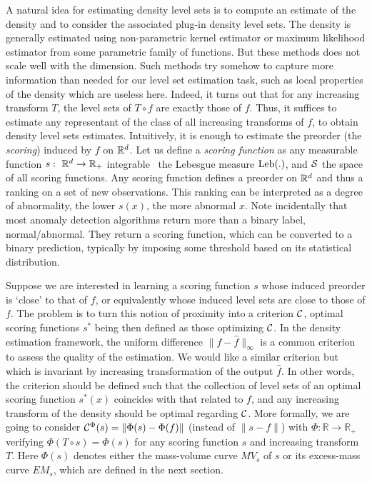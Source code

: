 
A natural idea for estimating density level sets is to compute an estimate of the density and to consider the associated plug-in density level sets.
The density is generally estimated using non-parametric kernel estimator or maximum likelihood estimator from some parametric family of functions. But these methods does not scale well with the dimension. Such methods try somehow to capture more information than needed for our level set estimation task, such as local properties of the density which are useless here. Indeed, it turns out that for any increasing transform $T$, the level sets of $T\circ f$ are exactly those of $f$. Thus, it suffices to estimate any representant of the class of all increasing transforms of $f$, to obtain density level sets estimates. Intuitively, it is enough to estimate the preorder (the \emph{scoring}) induced by $f$ on $\rset^d$. Let us define a \emph{scoring function} as any measurable function $s:~\rset^d \to \rset_+$ integrable \wrt~the Lebesgue measure $\leb(.)$, and $\S$ the space of all scoring functions.
Any scoring function defines a preorder on $\rset^d$ and thus a ranking on a set of new observations. This ranking can be interpreted as a degree of abnormality, the lower $s(x)$, the more abnormal $x$. Note incidentally that most anomaly detection algorithms return more than a binary label, normal/abnormal. They return a scoring function, which can be converted to a binary prediction, typically by imposing some threshold based on its statistical distribution.

Suppose we are interested in learning a scoring function $s$ whose induced preorder is `close' to that of $f$, or equivalently whose induced level sets are close to those of $f$. The problem is to turn this notion of proximity into a criterion $\crit$, optimal scoring functions $s^*$ being then defined as those optimizing $\crit$. In the density estimation framework, the uniform difference $\|f - \hat f\|_\infty$ is a common criterion to assess the quality of the estimation. We would like a similar criterion but which is invariant by increasing transformation of the output $\hat f$. In other words, the criterion should be defined such that the collection of level sets of an optimal scoring function $s^*(x)$ coincides with that related to $f$, and any increasing transform of the density should be optimal regarding $\crit$.
More formally, we are going to consider $\crit^{\Phi}(s) = \| \Phi(s) - \Phi(f) \|$ (instead of $\|s - f\|$) %
with $\Phi: \mathbb{R} \to \mathbb{R}_+$ verifying $\Phi(T \circ s) = \Phi(s)$ 
for any scoring function $s$ and increasing transform $T$. Here $\Phi(s)$ denotes either the mass-volume curve $MV_s$ of $s$ or its excess-mass curve $EM_s$, which are defined in the next section.  



